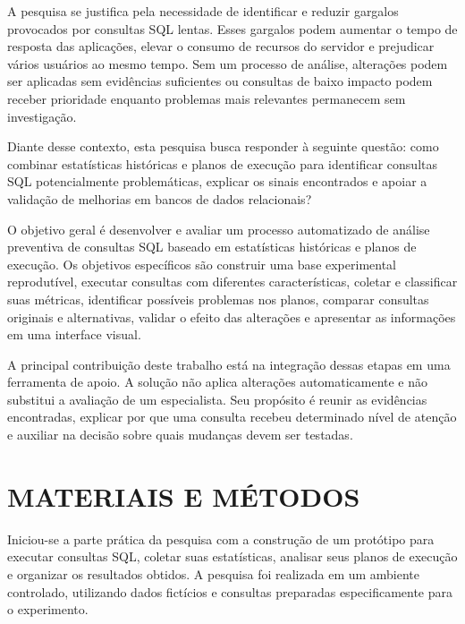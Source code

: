 \documentclass{UNESC}
\begin{document}
A pesquisa se justifica pela necessidade de identificar e reduzir gargalos provocados por consultas SQL lentas. Esses gargalos podem aumentar o tempo de resposta das aplicações, elevar o consumo de recursos do servidor e prejudicar vários usuários ao mesmo tempo. Sem um processo de análise, alterações podem ser aplicadas sem evidências suficientes ou consultas de baixo impacto podem receber prioridade enquanto problemas mais relevantes permanecem sem investigação.

Diante desse contexto, esta pesquisa busca responder à seguinte questão: como combinar estatísticas históricas e planos de execução para identificar consultas SQL potencialmente problemáticas, explicar os sinais encontrados e apoiar a validação de melhorias em bancos de dados relacionais?

O objetivo geral é desenvolver e avaliar um processo automatizado de análise preventiva de consultas SQL baseado em estatísticas históricas e planos de execução. Os objetivos específicos são construir uma base experimental reprodutível, executar consultas com diferentes características, coletar e classificar suas métricas, identificar possíveis problemas nos planos, comparar consultas originais e alternativas, validar o efeito das alterações e apresentar as informações em uma interface visual.

A principal contribuição deste trabalho está na integração dessas etapas em uma ferramenta de apoio. A solução não aplica alterações automaticamente e não substitui a avaliação de um especialista. Seu propósito é reunir as evidências encontradas, explicar por que uma consulta recebeu determinado nível de atenção e auxiliar na decisão sobre quais mudanças devem ser testadas.





\iffalse
\section{MATERIAIS E MÉTODOS}

Iniciou-se a parte prática da pesquisa com a construção de um protótipo para executar consultas SQL, coletar suas estatísticas, analisar seus planos de execução e organizar os resultados obtidos. A pesquisa foi realizada em um ambiente controlado, utilizando dados fictícios e consultas preparadas especificamente para o experimento.
\end{document}
